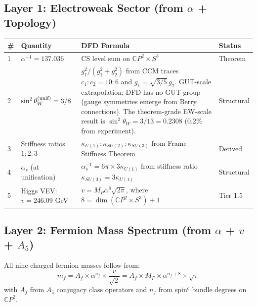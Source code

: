 \documentclass[12pt,a4paper]{article}
\newcommand{\CP}{\mathbb{C}P}
\begin{document}
\subsection{Layer 1: Electroweak Sector (from $\alpha$ + Topology)}

\begin{longtable}{p{0.5cm}p{4.5cm}p{6cm}p{2.5cm}}
\toprule
\# & \textbf{Quantity} & \textbf{DFD Formula} & \textbf{Status} \\
\midrule
\endhead
1 & $\alpha^{-1} = 137.036$ &
  CS level sum on $\CP^2 \times S^3$ &
  Theorem \\[4pt]

2 & $\sin^2\theta_W^{(\rm unif)} = 3/8$ &
  $g_1^2/(g_1^2 + g_2^2)$ from CCM traces $c_1:c_2 = 10:6$
  and $g_1 = \sqrt{3/5}\,g_2$.
  GUT-scale extrapolation; DFD has no GUT group (gauge symmetries emerge
  from Berry connections).  The theorem-grade EW-scale result is
  $\sin^2\theta_W = 3/13 = 0.2308$ ($0.2\%$ from experiment). &
  Structural \\[4pt]

3 & Stiffness ratios $1{:}2{:}3$ &
  $\kappa_{U(1)} : \kappa_{SU(2)} : \kappa_{SU(3)}$
  from Frame Stiffness Theorem &
  Derived \\[4pt]

4 & $\alpha_s$ (at unification) &
  $\alpha_s^{-1} = 6\pi \times 3\kappa_{U(1)}$ from stiffness
  ratio $\kappa_{SU(3)} = 3\kappa_{U(1)}$ &
  Structural \\[4pt]

5 & Higgs VEV: $v = 246.09$ GeV &
  $v = M_P \alpha^8 \sqrt{2\pi}$, where $8 = \dim(\CP^2 \times S^3) + 1$ &
  Tier 1.5 \\[4pt]

\bottomrule
\end{longtable}

\subsection{Layer 2: Fermion Mass Spectrum (from $\alpha$ + $v$ + $A_5$)}

All nine charged fermion masses follow from:
\[
\boxed{m_f = A_f \times \alpha^{n_f} \times \frac{v}{\sqrt{2}}
= A_f \times M_P \times \alpha^{n_f + 8} \times \sqrt{\pi}}
\]
with $A_f$ from $A_5$ conjugacy class operators and $n_f$ from spin$^c$
bundle degrees on $\CP^2$.
\end{document}
